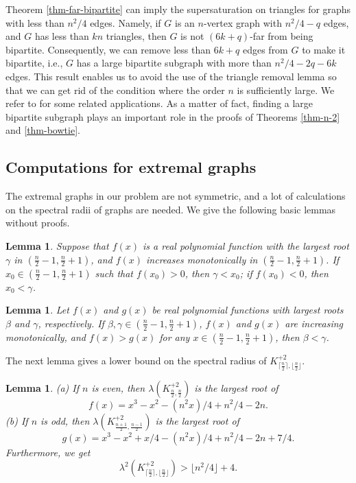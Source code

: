\documentclass[11pt]{article}
\newtheorem{lemma}[theorem]{Lemma}
\begin{document}
\fi 

Theorem \ref{thm-far-bipartite} can imply the supersaturation on triangles 
for graphs with less than $n^2/4$ edges. 
Namely, if $G$ is an $n$-vertex graph with 
$n^2/4 - q$ edges, and $G$ has less than $kn$ triangles, then 
$G$ is not $(6k +q)$-far from being bipartite. 
Consequently, we can remove less than 
$6k+q$ edges from $G$ to make it bipartite, i.e., $G$ has a large bipartite subgraph with more than $n^2/4 - 2q-6k$ edges. 
This result enables us to avoid the use of the triangle removal lemma 
so that we can get rid of the condition where the order $n$ is sufficiently large.  
We refer to 
\cite{LFP2024-triangular} for some related applications. 
As a matter of fact, finding a large bipartite subgraph 
plays an important role in the proofs of   
Theorems \ref{thm-n-2} and \ref{thm-bowtie}.  




\subsection{Computations for extremal graphs}

The extremal graphs in our problem are 
not symmetric, 
and a lot of calculations on the spectral radii of graphs are needed. 
We give the following basic lemmas without proofs. 

\begin{lemma} \label{lem-root}
Suppose that $f(x)$ is a real polynomial function  with the largest root 
$\gamma$ in 
$(\frac{n}{2}-1, \frac{n}{2}+1)$, and $f(x)$ increases monotonically in $(\frac{n}{2}-1, \frac{n}{2}+1)$. 
If $x_0\in (\frac{n}{2}-1, \frac{n}{2}+1)$ such that $f(x_0) >0$, then $\gamma < x_0$; 
if $f(x_0) <0$, then $x_0< \gamma$. 
\end{lemma}

\begin{lemma} \label{lem-roots}
Let $f(x)$ and $g(x)$ be real polynomial functions with largest roots $\beta$ and $\gamma$, respectively.  
If  $\beta, \gamma \in (\frac{n}{2}-1, \frac{n}{2} +1)$, 
 $f(x)$ and $g(x)$ are increasing monotonically,  
and $f(x)> g(x)$ for any $x\in (\frac{n}{2}-1, \frac{n}{2} +1)$, 
then  $\beta < \gamma$. 
\end{lemma}




The next lemma gives
a lower bound on the spectral radius of 
$K_{\lceil \frac{n}{2} \rceil, \lfloor \frac{n}{2} \rfloor}^{+2}$. 

\begin{lemma} \label{lem-F-G}
(a) If $n$ is even, then $\lambda (K_{\frac{n}{2},  \frac{n}{2}}^{+2})$ is the largest root of 
\[  f(x)= x^3 - x^2 - (n^2 x)/4 + n^2/4 - 2 n. \]
(b) If $n$ is odd, then 
$\lambda (K_{ \frac{n+1}{2}, \frac{n-1}{2}}^{+2})$ is the largest root of 
\[   g(x) = x^3 - x^2 + x/4 - (n^2 x)/4 + n^2/4 - 2 n + 7/4. \]
Furthermore, we get 
\[  \lambda^2 (K_{\lceil \frac{n}{2} \rceil, \lfloor \frac{n}{2} \rfloor}^{+2}) > \lfloor n^2/4 \rfloor  +4. \]
\end{lemma}
\end{document}
